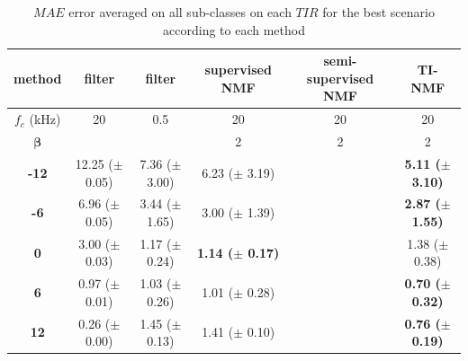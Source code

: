 \documentclass[twocolumn,a4paper,10pt]{article}
\begin{document}
\begin{table}[t]
\centering
\begin{tabular}{@{}cccccc@{}}
\toprule
\textbf{method} & filter & filter & supervised NMF & semi-supervised NMF & TI-NMF \\ \midrule
$f_c$ (kHz) & 20 & 0.5 & 20 & 20 & 20 \\
$\mathbf{\beta}$ &  &  & 2 & 2 & 2 \\ \hline
\textbf{-12} & 12.25 ($\pm$ 0.05) & 7.36 ($\pm$ 3.00) & 6.23 ($\pm$ 3.19) &  & \textbf{5.11 ($\pm$ 3.10)} \\
\textbf{-6} & 6.96 ($\pm$ 0.05) & 3.44 ($\pm$ 1.65) & 3.00 ($\pm$ 1.39) &  & \textbf{2.87 ($\pm$ 1.55)} \\
\textbf{0} & 3.00 ($\pm$ 0.03) & 1.17 ($\pm$ 0.24) & \textbf{1.14 ($\pm$ 0.17)} &  & 1.38 ($\pm$ 0.38) \\
\textbf{6} & 0.97 ($\pm$ 0.01) & 1.03 ($\pm$ 0.26) & 1.01 ($\pm$ 0.28) &  & \textbf{0.70 ($\pm$ 0.32)} \\
\textbf{12} & 0.26 ($\pm$ 0.00) & 1.45 ($\pm$ 0.13) & 1.41 ($\pm$ 0.10) &  & \textbf{0.76 ($\pm$ 0.19)} \\ \bottomrule
\end{tabular}
\caption{$MAE$ error averaged on all sub-classes on each $TIR$ for the best scenario according to each method}
\label{tab:results_TIR}
\end{table}
\end{document}
